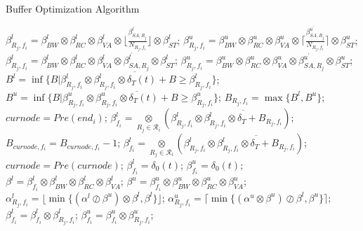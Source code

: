 \documentclass[10pt,journal]{IEEEtran}
\begin{document}
\begin{algorithm}
\caption{Buffer Optimization Algorithm}
\label{alg:bufopt}
\begin{algorithmic}[1]
                \STATE $\beta_{R_j,f_i}^l=\beta_{BW}^l\otimes\beta_{RC}^l\otimes\beta_{VA}^l\otimes\lfloor\frac{\beta_{SA,R_j}^{l^\prime}}{N_{R_j,f_i}}\rfloor\otimes\beta_{ST}^l$;
                \STATE $\beta_{R_j,f_i}^u=\beta_{BW}^u\otimes\beta_{RC}^u\otimes\beta_{VA}^u\otimes\lceil\frac{\beta_{SA,R_j}^{u^\prime}}{N_{R_j,f_i}}\rceil\otimes\beta_{ST}^u$;
            \ELSE
                \STATE $\beta_{R_j,f_i}^l=\beta_{BW}^l\otimes\beta_{RC}^l\otimes\beta_{VA}^l\otimes\beta_{SA,R_j}^{l^\prime}\otimes\beta_{ST}^l$;
                \STATE $\beta_{R_j,f_i}^u=\beta_{BW}^u\otimes\beta_{RC}^u\otimes\beta_{VA}^u\otimes\beta_{SA,R_j}^{u^\prime}\otimes\beta_{ST}^u$;
            \ENDIF
            \STATE $B^l=\inf\{B|\beta_{R_j,f_i}^l\otimes\overline{\beta_{R_j,f_i}^l\otimes\delta_T(t)+B}\geq\beta_{R_j,f_i}^l\}$;
            \STATE $B^u=\inf\{B|\beta_{R_j,f_i}^u\otimes\overline{\beta_{R_j,f_i}^u\otimes\delta_T(t)+B}\geq\beta_{R_j,f_i}^u\}$;
            \STATE $B_{R_j,f_i}=\max\{B^l,B^u\}$;
        \ENDFOR
        \STATE $curnode=Pre(end_i)$;
            \STATE $\beta_{f_i}^l=\underset{R_{j}\in\mathcal{R}_i}{\otimes}(\beta^l_{R_j,f_i}\otimes\overline{\beta^l_{R_j,f_i}\otimes\delta_T+B_{R_j,f_i}})$;
                \STATE $B_{curnode,f_i}=B_{curnode,f_i}-1$;
                \STATE $\beta_{f_i}^l=\underset{R_{j}\in\mathcal{R}_i}{\otimes}(\beta^l_{R_j,f_i}\otimes\overline{\beta^l_{R_j,f_i}\otimes\delta_T+B_{R_j,f_i}})$;
            \ENDWHILE
            \STATE $curnode=Pre(curnode)$;
        \ENDWHILE
        \STATE $\beta_{f_i}^l=\delta_0(t)$; $\beta_{f_i}^u=\delta_0(t)$;
            \STATE $\beta^l=\beta^l_{f_i}\otimes\beta_{BW}^l\otimes\beta_{RC}^l\otimes\beta_{VA}^l$;
            \STATE $\beta^u=\beta^u_{f_i}\otimes\beta_{BW}^u\otimes\beta_{RC}^u\otimes\beta_{VA}^u$;
            \STATE $\alpha^l_{R_j,f_i}=\lfloor\min\{(\alpha^l\oslash\beta^u)\otimes\beta^l,\beta^l\}\rfloor$;
            \STATE $\alpha^u_{R_j,f_i}=\lceil\min\{(\alpha^u\otimes\beta^u)\oslash\beta^l,\beta^u\}\rceil$;
            \STATE $\beta_{f_i}^l=\beta_{f_i}^l\otimes\beta_{R_j,f_i}^l$; $\beta_{f_i}^u=\beta_{f_i}^u\otimes\beta_{R_j,f_i}^u$;

\end{algorithmic}
\end{algorithm}
\end{document}
